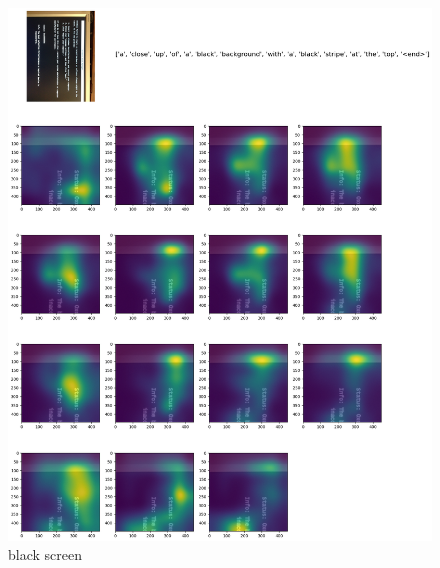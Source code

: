 \documentclass[11pt,a4paper]{article}
\begin{document}
\begin{figure}[h]
  \includegraphics[width=\linewidth]{VizWiz_train_00000858.png}
  \caption{black screen}
  \label{fig:blackscreen}
\end{figure}
\end{document}
